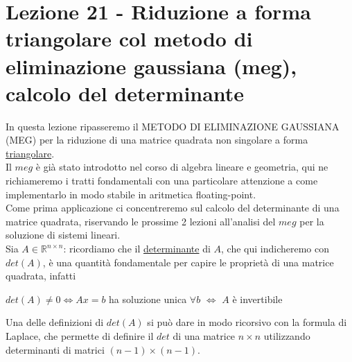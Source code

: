 \documentclass[12pt,a4paper]{article}
\begin{document}
\section[Lezione 21 - Metodo di Gauss, calcolo determinante]{Lezione 21 - Riduzione a forma triangolare col metodo di eliminazione gaussiana (meg), calcolo del determinante}
In questa lezione ripasseremo il METODO DI ELIMINAZIONE GAUSSIANA (MEG) per la riduzione di una matrice quadrata non singolare a forma \uline{triangolare}.\\ Il $meg$ è già stato introdotto nel corso di algebra lineare e geometria, qui ne richiameremo i tratti fondamentali con una particolare attenzione a come implementarlo in modo stabile in aritmetica floating-point.\\Come prima applicazione ci concentreremo sul calcolo del determinante di una matrice quadrata, riservando le prossime 2 lezioni all'analisi del $meg$ per la soluzione di sistemi lineari.\\Sia $A\in\mathbb{R}^{n\times n}$: ricordiamo che il \uline{determinante} di $A$, che qui indicheremo con $det(A)$, è una quantità fondamentale per capire le proprietà di una matrice quadrata, infatti 
\begin{center}
    $det(A)\neq0\iff Ax=b$ ha soluzione unica $\forall b$ $\iff$ $A$ è invertibile 
\end{center}
Una delle definizioni di $det(A)$ si può dare in modo ricorsivo con la formula di Laplace, che permette di definire il $det$ di una matrice $n\times n$ utilizzando determinanti di matrici $(n-1)\times(n-1)$.
\end{document}
